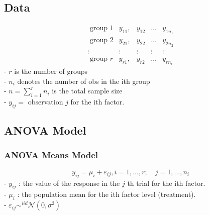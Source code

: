 \documentclass[11pt,a4paper]{article}
\begin{document}
\subsection{Data}
$$\begin{array}{ccccc}\text { group } 1 & y_{11}, & y_{12} & \ldots & y_{1 n_{1}} \\ \text { group } 2 & y_{21}, & y_{22} & \ldots & y_{2 n_{2}} \\ \vdots & \vdots & \vdots & \vdots & \vdots \\ \text { group } r & y_{r 1}, & y_{r 2} & \ldots & y_{r n_{r}}\end{array}$$
- $r$ is the number of groups\\
- $n_{i}$ denotes the number of obs in the ith group\\
- $n=\sum_{i=1}^{r} n_{i}$ is the total sample size\\
- $y_{i j}=$ observation $j$ for the ith factor.
\subsection{ANOVA Model}
\subsubsection{ANOVA Means Model}
$$
y_{i j}=\mu_{i}+\varepsilon_{i j}, i=1, \ldots, r ; \quad j=1, \ldots, n_{i}
$$
- $y_{i j}$ : the value of the response in the $j$ th trial for the ith factor.\\
- $\mu_{i}$ : the population mean for the ith factor level (treatment).\\
- $\varepsilon_{i j} \sim^{i i d} \mathcal{N}\left(0, \sigma^{2}\right)$
\end{document}
